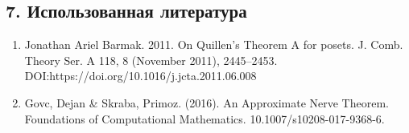 \documentclass[a4paper,12pt]{report}
\begin{document}
\subsection*{7. Использованная литература}
\begin{enumerate}
  \item Jonathan Ariel Barmak. 2011. On Quillen’s Theorem A for posets. J. Comb. Theory Ser. A 118, 8 (November 2011), 2445–2453. DOI:https://doi.org/10.1016/j.jcta.2011.06.008
  \item Govc, Dejan \& Skraba, Primoz. (2016). An Approximate Nerve Theorem. Foundations of Computational Mathematics. 10.1007/s10208-017-9368-6.
\end{enumerate}
\end{document}
